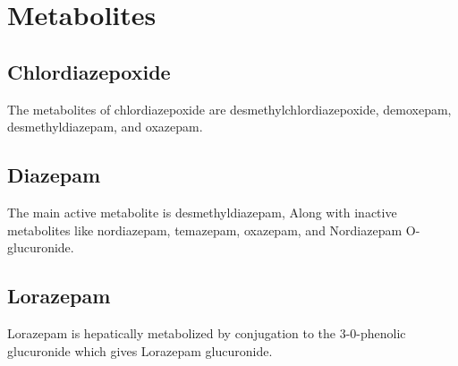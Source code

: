 \chapter{Metabolites}

\section{Chlordiazepoxide}
\label{sec:met:chlor}
The metabolites of chlordiazepoxide are desmethylchlordiazepoxide, demoxepam, desmethyldiazepam, and oxazepam.\cite{schwartz1971biological}


\section{Diazepam}
 	The main active metabolite is desmethyldiazepam, Along with inactive metabolites like nordiazepam, temazepam, oxazepam, and Nordiazepam O-glucuronide.\cite{RCM:RCM3613}


\section{Lorazepam} 
Lorazepam is hepatically metabolized by conjugation to the 3-0-phenolic glucuronide which gives Lorazepam glucuronide.\cite{elliott1976metabolism}

